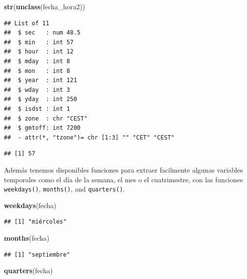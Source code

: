 \documentclass[11pt,]{book}
\newenvironment{Shaded}{\begin{snugshade}}{\end{snugshade}}
\newcommand{\CommentTok}[1]{\textcolor[rgb]{0.37,0.37,0.37}{\textit{#1}}}
\newcommand{\KeywordTok}[1]{\textcolor[rgb]{0.27,0.27,0.27}{\textbf{#1}}}
\newcommand{\NormalTok}[1]{#1}
\newcommand{\OperatorTok}[1]{\textcolor[rgb]{0.43,0.43,0.43}{\textbf{#1}}}
\begin{document}
\begin{Shaded}
\begin{Highlighting}[]
\KeywordTok{str}\NormalTok{(}\KeywordTok{unclass}\NormalTok{(fecha_hora2))}
\end{Highlighting}
\end{Shaded}

\begin{verbatim}
## List of 11
##  $ sec   : num 48.5
##  $ min   : int 57
##  $ hour  : int 12
##  $ mday  : int 8
##  $ mon   : int 8
##  $ year  : int 121
##  $ wday  : int 3
##  $ yday  : int 250
##  $ isdst : int 1
##  $ zone  : chr "CEST"
##  $ gmtoff: int 7200
##  - attr(*, "tzone")= chr [1:3] "" "CET" "CEST"
\end{verbatim}

\begin{Shaded}
\end{Shaded}

\begin{verbatim}
## [1] 57
\end{verbatim}

Además tenemos disponibles funciones para extraer facilmente algunas variables temporales como el día de la semana, el mes o el cuatrimestre, con las funciones \texttt{weekdays()}, \texttt{months()}, and \texttt{quarters()}.

\begin{Shaded}
\begin{Highlighting}[]
\KeywordTok{weekdays}\NormalTok{(fecha)}
\end{Highlighting}
\end{Shaded}

\begin{verbatim}
## [1] "miércoles"
\end{verbatim}

\begin{Shaded}
\begin{Highlighting}[]
\KeywordTok{months}\NormalTok{(fecha)}
\end{Highlighting}
\end{Shaded}

\begin{verbatim}
## [1] "septiembre"
\end{verbatim}

\begin{Shaded}
\begin{Highlighting}[]
\KeywordTok{quarters}\NormalTok{(fecha)}
\end{Highlighting}
\end{Shaded}
\end{document}
